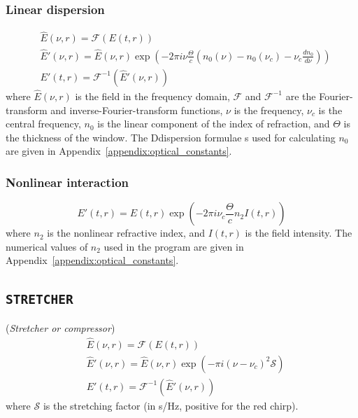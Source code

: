 \documentclass{report}
\begin{document}
\subsubsection*{Linear dispersion}
\begin{equation}
\begin{aligned}
&\widehat{E}(\nu,r) = \mathcal{F}(E(t,r))\\
&\widehat{E}'(\nu,r) = \widehat{E}(\nu,r) \exp \left( - 2 \pi i \nu \frac{\Theta}{c} \left(n_0(\nu)-n_0(\nu_c) -\nu_c \frac{d n_0}{d\nu}\right) \right)\\
&E'(t,r) = \mathcal{F}^{-1}(\widehat{E}'(\nu,r))
\end{aligned}
\end{equation}
where $\widehat{E}(\nu,r)$ is the field in the frequency domain, $\mathcal{F}$ and $\mathcal{F}^{-1}$ are the Fourier-transform and inverse-Fourier-transform functions, $\nu$ is the frequency, $\nu_c$ is the central frequency, $n_0$ is the linear component of the index of refraction, and $\Theta$ is the thickness of the window. The Ddispersion formulae s used for calculating $n_0$ are given in Appendix~\ref{appendix:optical_constants}.
\subsubsection*{Nonlinear interaction}
\begin{equation}
E'(t,r) = E(t,r) \exp\left(-2\pi i \nu_c \frac{\Theta}{c} n_2 I(t,r)\right)
\end{equation}
where $n_2$ is the nonlinear refractive index, and $I(t,r)$ is the field intensity. The numerical values of $n_2$ used in the program are given in Appendix~\ref{appendix:optical_constants}.

\subsection*{\texttt{STRETCHER}}
(\textit{Stretcher or compressor})
\begin{equation}
\begin{aligned}
&\widehat{E}(\nu,r) = \mathcal{F}(E(t,r))\\
&\widehat{E}'(\nu,r) = \widehat{E}(\nu,r) \exp\left(- \pi i (\nu-\nu_c)^2  \mathcal{S}\right)\\
&E'(t,r) = \mathcal{F}^{-1}(\widehat{E}'(\nu,r))
\end{aligned}
\end{equation}
where $\mathcal{S}$ is the stretching factor (in s/Hz, positive for the red chirp).
\end{document}
